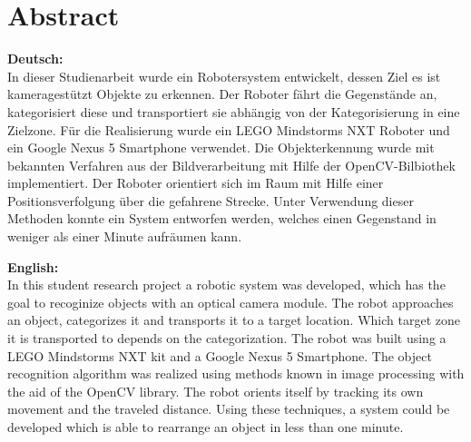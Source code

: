 \chapter*{Abstract}

\textbf{Deutsch:}\\
In dieser Studienarbeit wurde ein Robotersystem entwickelt, dessen Ziel es ist kameragestützt Objekte zu erkennen. Der Roboter fährt die Gegenstände an, kategorisiert diese und transportiert sie abhängig von der Kategorisierung in eine Zielzone. Für die Realisierung wurde ein LEGO Mindstorms NXT Roboter und ein Google Nexus 5 Smartphone verwendet. Die Objekterkennung wurde mit bekannten Verfahren aus der Bildverarbeitung mit Hilfe der OpenCV-Bilbiothek implementiert. Der Roboter orientiert sich im Raum mit Hilfe einer Positionsverfolgung über die gefahrene Strecke. Unter Verwendung dieser Methoden konnte ein System entworfen werden, welches einen Gegenstand in weniger als einer Minute aufräumen kann.

\vspace{1cm}

\textbf{English:}\\
In this student research project a robotic system was developed, which has the goal to recoginize objects with an optical camera module. The robot approaches an object, categorizes it and transports it to a target location. Which target zone it is transported to depends on the categorization. The robot was built using a LEGO Mindstorms NXT kit and a Google Nexus 5 Smartphone. The object recognition algorithm was realized using methods known in image processing with the aid of the OpenCV library. The robot orients itself by tracking its own movement and the traveled distance. Using these techniques, a system could be developed which is able to rearrange an object in less than one minute.